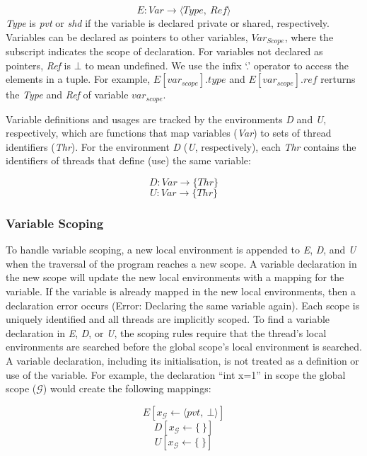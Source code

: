 \begin{equation*}
	E: Var \to \langle Type,~Ref \rangle
\end{equation*}
\emph{Type} is \emph{pvt} or \emph{shd} if the variable is declared private 
or shared, respectively. Variables can be declared as pointers to other 
variables, $Var_{Scope}$, where the subscript indicates the scope of declaration. 
For variables not declared as pointers, \emph{Ref} is $\bot$ to mean undefined. 
We use the infix `.' operator to access the elements in a tuple. For example, 
$E[var_{scope}].type$ and $E[var_{scope}].ref$ rerturns the \emph{Type} and 
\emph{Ref} of variable $var_{scope}$.

Variable definitions and usages are tracked by the environments \emph{D} and 
\emph{U}, respectively, which are functions that map variables (\emph{Var}) 
to sets of thread identifiers (\emph{Thr}). For the environment \emph{D} 
(\emph{U}, respectively), each \emph{Thr} contains the identifiers of threads 
that define (use) the same variable: 

\begin{equation*}
	D: Var \to \{Thr\}
\end{equation*}
\begin{equation*}
	U: Var \to \{Thr\}
\end{equation*}

\subsubsection{Variable Scoping}
To handle variable scoping, a new local environment is appended to 
\emph{E}, \emph{D}, and \emph{U} when the traversal of the program 
reaches a new scope. A variable declaration in the new scope will 
update the new local environments with a mapping for the variable. 
If the variable is already mapped in the new local environments, 
then a declaration error occurs (Error: Declaring the same variable again). 
Each scope is uniquely identified and all threads are implicitly 
scoped. To find a variable declaration in \emph{E}, \emph{D}, or 
\emph{U}, the scoping rules require that the thread's local environments 
are searched before the global scope's local environment is searched. 
A variable declaration, including its initialisation, is not treated 
as a definition or use of the variable. For example, the declaration 
``int x=1'' in scope the global scope ($\mathcal{G}$) would create the 
following mappings:

\begin{equation*}
	E[x_\mathcal{G} \gets \langle pvt,~\bot \rangle]
\end{equation*}
\begin{equation*}
	D[x_\mathcal{G} \gets \{~\}]
\end{equation*}
\begin{equation*}
	U[x_\mathcal{G} \gets \{~\}]
\end{equation*}


